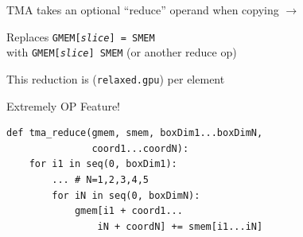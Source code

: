 \begin{minipage}[t]{0.5\textwidth}\fixminipage
TMA takes an optional ``reduce'' operand when copying $\to$

Replaces \texttt{GMEM[\textit{slice}] = SMEM}\\
with \texttt{GMEM[\textit{slice}] \violetBox{+=} SMEM} (or another reduce op)

This reduction is  (\texttt{relaxed.gpu}) per element

Extremely OP Feature!

\begin{verbatim}
def tma_reduce(gmem, smem, boxDim1...boxDimN,
               coord1...coordN):
    for i1 in seq(0, boxDim1):
        ... # N=1,2,3,4,5
        for iN in seq(0, boxDimN):
            gmem[i1 + coord1...
                iN + coordN] += smem[i1...iN]
\end{verbatim}
\end{minipage}
\hfill
